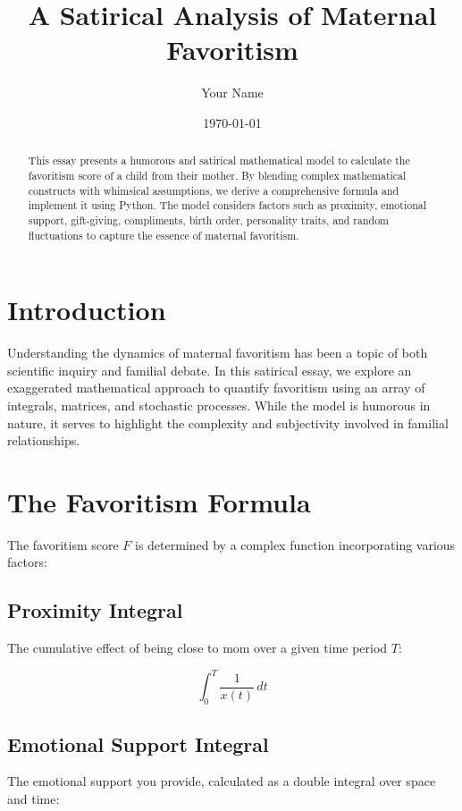 \documentclass[12pt]{article}
\begin{document}
\title{A Satirical Analysis of Maternal Favoritism}
\author{Your Name}
\date{\today}

\maketitle

\begin{abstract}
This essay presents a humorous and satirical mathematical model to calculate the favoritism score of a child from their mother. By blending complex mathematical constructs with whimsical assumptions, we derive a comprehensive formula and implement it using Python. The model considers factors such as proximity, emotional support, gift-giving, compliments, birth order, personality traits, and random fluctuations to capture the essence of maternal favoritism.
\end{abstract}

\tableofcontents

\section{Introduction}

Understanding the dynamics of maternal favoritism has been a topic of both scientific inquiry and familial debate. In this satirical essay, we explore an exaggerated mathematical approach to quantify favoritism using an array of integrals, matrices, and stochastic processes. While the model is humorous in nature, it serves to highlight the complexity and subjectivity involved in familial relationships.

\section{The Favoritism Formula}

The favoritism score \( F \) is determined by a complex function incorporating various factors:

\subsection{Proximity Integral}
The cumulative effect of being close to mom over a given time period \( T \):

\begin{equation}
\int_0^T \frac{1}{x(t)} \, dt
\end{equation}

\subsection{Emotional Support Integral}
The emotional support you provide, calculated as a double integral over space and time:
\end{document}
